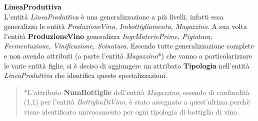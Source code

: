 \begin{flushleft}
	\textbf{\large{LineaProduttiva}}\\
	L'entità \emph{LineaProduttiva} è una generalizzazione a più livelli, infatti essa generalizza le entità \emph{ProduzioneVino, Imbottigliamento, Magazzino}. A sua volta l'entità \textbf{ProduzioneVino} generalizza \emph{IngrMateriePrime, Pigiatura, Fermentazione, Vinificazione, Svinatura}. Essendo tutte generalizzazione complete e non avendo attributi (a parte l'entità \emph{Magazzino}*) che vanno a particolarizzare le varie entità figlie, si è deciso di aggiungere un attributo \textbf{Tipologia} nell'entità \emph{LineaProduttiva} che identifica queste specializzazioni.
\end{flushleft}

\begin{verse}
	*L'attributo \textbf{NumBottiglie} dell'entità \emph{Magazzino}, essendo di cardinalità (1,1) per l'entità \emph{BottigliaDiVino}, è stato assegnato a quest'ultima perchè viene identificato univocamento per ogni tipologia di bottiglia di vino.
\end{verse}